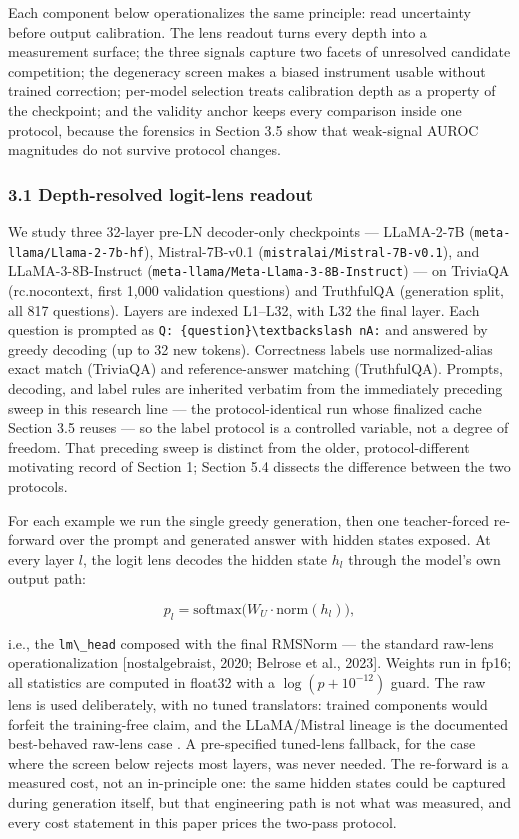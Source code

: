 
Each component below operationalizes the same principle: read uncertainty before output calibration. The lens readout turns every depth into a measurement surface; the three signals capture two facets of unresolved candidate competition; the degeneracy screen makes a biased instrument usable without trained correction; per-model selection treats calibration depth as a property of the checkpoint; and the validity anchor keeps every comparison inside one protocol, because the forensics in Section 3.5 show that weak-signal AUROC magnitudes do not survive protocol changes.

\subsubsection{3.1 Depth-resolved logit-lens readout}

We study three 32-layer pre-LN decoder-only checkpoints --- LLaMA-2-7B (\texttt{meta-llama/Llama-2-7b-hf}), Mistral-7B-v0.1 (\texttt{mistralai/Mistral-7B-v0.1}), and LLaMA-3-8B-Instruct (\texttt{meta-llama/Meta-Llama-3-8B-Instruct}) --- on TriviaQA (rc.nocontext, first 1,000 validation questions) and TruthfulQA (generation split, all 817 questions). Layers are indexed L1--L32, with L32 the final layer. Each question is prompted as \texttt{Q: \{question\}\textbackslash textbackslash nA:} and answered by greedy decoding (up to 32 new tokens). Correctness labels use normalized-alias exact match (TriviaQA) and reference-answer matching (TruthfulQA). Prompts, decoding, and label rules are inherited verbatim from the immediately preceding sweep in this research line --- the protocol-identical run whose finalized cache Section 3.5 reuses --- so the label protocol is a controlled variable, not a degree of freedom. That preceding sweep is distinct from the older, protocol-different motivating record of Section 1; Section 5.4 dissects the difference between the two protocols.

For each example we run the single greedy generation, then one teacher-forced re-forward over the prompt and generated answer with hidden states exposed. At every layer $l$, the logit lens decodes the hidden state $h_l$ through the model's own output path:

$$p_l = \mathrm{softmax}\big(W_U \cdot \mathrm{norm}(h_l)\big),$$

i.e., the \texttt{lm\textbackslash \_head} composed with the final RMSNorm --- the standard raw-lens operationalization [nostalgebraist, 2020; Belrose et al., 2023]. Weights run in fp16; all statistics are computed in float32 with a $\log(p + 10^{-12})$ guard. The raw lens is used deliberately, with no tuned translators: trained components would forfeit the training-free claim, and the LLaMA/Mistral lineage is the documented best-behaved raw-lens case \citep{Belrose2023}. A pre-specified tuned-lens fallback, for the case where the screen below rejects most layers, was never needed. The re-forward is a measured cost, not an in-principle one: the same hidden states could be captured during generation itself, but that engineering path is not what was measured, and every cost statement in this paper prices the two-pass protocol.

